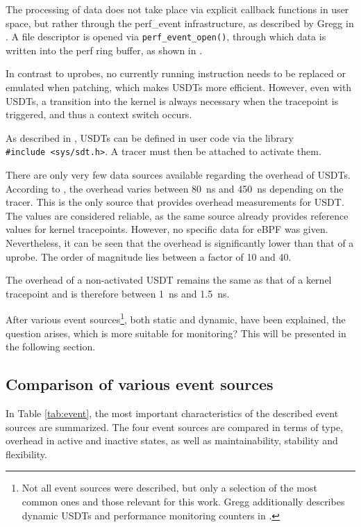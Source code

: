 The processing of data does not take place via explicit callback functions in user space, but rather through the perf\_event infrastructure, as described by Gregg in \cite[Chap.~2.13]{Gregg_2020}.  
A file descriptor is opened via \texttt{perf\_event\_open()}, through which data is written into the perf ring buffer, as shown in \cite{perf_event}.  

In contrast to \acp{uprobe}, no currently running instruction needs to be replaced or emulated when patching, which makes \acp{USDT} more efficient.  
However, even with \acp{USDT}, a transition into the kernel is always necessary when the tracepoint is triggered, and thus a context switch occurs.  

As described in \cite{USDT}, \acp{USDT} can be defined in user code via the library \\
\texttt{\#include <sys/sdt.h>}.  
A tracer must then be attached to activate them.  

There are only very few data sources available regarding the overhead of \acp{USDT}.  
According to \cite[p.~26:28]{tracepoint_comp}, the overhead varies between 80~ns and 450~ns depending on the tracer.  
This is the only source that provides overhead measurements for \ac{USDT}.  
The values are considered reliable, as the same source already provides reference values for kernel tracepoints.  
However, no specific data for eBPF was given.  
Nevertheless, it can be seen that the overhead is significantly lower than that of a \ac{uprobe}.  
The order of magnitude lies between a factor of 10 and 40.  

The overhead of a non-activated \ac{USDT} remains the same as that of a kernel tracepoint and is therefore between 1~ns and 1.5~ns.  

After various event sources\footnote{Not all event sources were described, but only a selection of the most common ones and those relevant for this work. Gregg additionally describes dynamic \acp{USDT} and performance monitoring counters in \cite[Chap.~2.11, Chap.~2.12]{Gregg_2020}.}, both static and dynamic, have been explained, the question arises, which is more suitable for monitoring? 
This will be presented in the following section.

\subsection{Comparison of various event sources}
In Table \ref{tab:event}, the most important characteristics of the described event sources are summarized.  
The four event sources are compared in terms of type, overhead in active and inactive states, as well as maintainability, stability and flexibility.  

